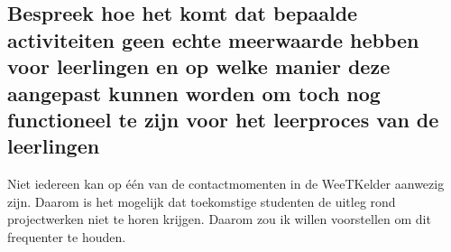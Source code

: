 \documentclass[a4paper,12pt,twoside]{article}%
\begin{document}
	\subsection{Bespreek hoe het komt dat bepaalde activiteiten geen echte meerwaarde hebben voor leerlingen en op welke manier deze aangepast kunnen worden om toch nog functioneel te zijn voor het leerproces van de leerlingen}
	Niet iedereen kan op één van de contactmomenten in de WeeTKelder aanwezig zijn. Daarom is het mogelijk dat toekomstige studenten de uitleg rond projectwerken niet te horen krijgen. Daarom zou ik willen voorstellen om dit frequenter te houden.
	
	
	\newpage
	
	
	
	
	
	
	
	
	
	
	
	
	
	
	
	
	
	
	
\end{document}
